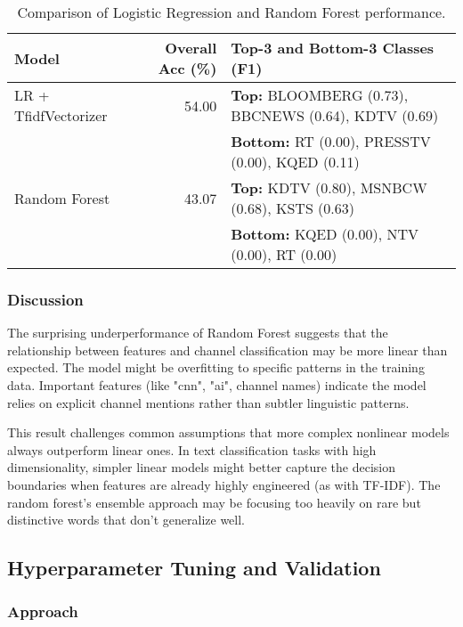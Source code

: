 \documentclass[11pt]{article}
\begin{document}
\begin{table}
\centering
\begin{tabularx}{\textwidth}{lrX}
 \toprule
 Model & Overall Acc (\%) & Top-3 and Bottom-3 Classes (F1) \\
 \midrule
 LR + TfidfVectorizer & 54.00 & \textbf{Top:} BLOOMBERG (0.73), BBCNEWS (0.64), KDTV (0.69) \\
                       &       & \textbf{Bottom:} RT (0.00), PRESSTV (0.00), KQED (0.11) \\
 \midrule
 Random Forest & 43.07 & \textbf{Top:} KDTV (0.80), MSNBCW (0.68), KSTS (0.63) \\
               &       & \textbf{Bottom:} KQED (0.00), NTV (0.00), RT (0.00) \\
 \bottomrule
\end{tabularx}
\caption{\label{tab:rf_results} Comparison of Logistic Regression and Random Forest performance.}
\end{table}

\subsubsection{Discussion}

The surprising underperformance of Random Forest suggests that the relationship between features and channel classification may be more linear than expected. The model might be overfitting to specific patterns in the training data. Important features (like "cnn", "ai", channel names) indicate the model relies on explicit channel mentions rather than subtler linguistic patterns.

This result challenges common assumptions that more complex nonlinear models always outperform linear ones. In text classification tasks with high dimensionality, simpler linear models might better capture the decision boundaries when features are already highly engineered (as with TF-IDF). The random forest's ensemble approach may be focusing too heavily on rare but distinctive words that don't generalize well.

\subsection{Hyperparameter Tuning and Validation}

\subsubsection{Approach}
\end{document}

